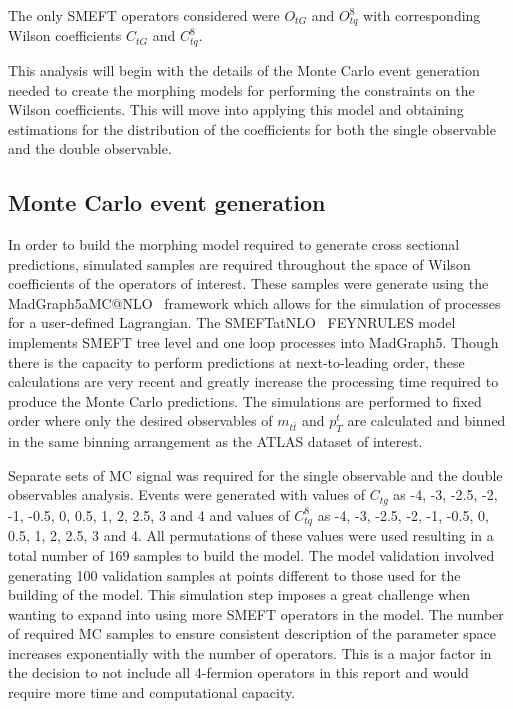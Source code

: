 \documentclass[a4paper,11pt]{article}
\begin{document}
The only SMEFT operators considered were $O_{tG}$ and $O_{tq}^{8}$ with corresponding Wilson coefficients $C_{tG}$ and $C_{tq}^8$. 

This analysis will begin with the details of the Monte Carlo event generation needed to create the morphing models for performing the constraints on the Wilson coefficients.
This will move into applying this model and obtaining estimations for the distribution of the coefficients for both the single observable and the double observable.

\subsection{Monte Carlo event generation}
In order to build the morphing model required to generate cross sectional predictions, simulated samples are required throughout the space of Wilson coefficients of the operators of interest.
These samples were generate using the MadGraph5\textunderscore aMC@NLO~\cite{Alwall_2014} framework which allows for the simulation of processes for a user-defined Lagrangian.
The SMEFTatNLO~\cite{degrande2020automated} FEYNRULES model implements SMEFT tree level and one loop processes into MadGraph5.
Though there is the capacity to perform predictions at next-to-leading order, these calculations are very recent  and greatly increase the processing time required to produce the Monte Carlo predictions.
The simulations are performed to fixed order where only the desired observables of $m_{t\bar{t}}$ and ${p_{T}^{t}}$ are calculated and binned in the same binning arrangement as the ATLAS dataset of interest.

Separate sets of MC signal was required for the single observable and the double observables analysis.
Events were generated with values of $C_{tg}$ as -4, -3, -2.5, -2, -1, -0.5, 0, 0.5, 1, 2, 2.5, 3 and 4 and values of $C_{tq}^{8}$ as -4, -3, -2.5, -2, -1, -0.5, 0, 0.5, 1, 2, 2.5, 3 and 4. 
All permutations of these values were used resulting in a total number of 169 samples to build the model.
The model validation involved generating 100 validation samples at points different to those used for the building of the model.
This simulation step imposes a great challenge when wanting to expand into using more SMEFT operators in the model.
The number of required MC samples to ensure consistent description of the parameter space increases exponentially with the number of operators.
This is a major factor in the decision to not include all 4-fermion operators in this report and would require more time and computational capacity.
\end{document}
